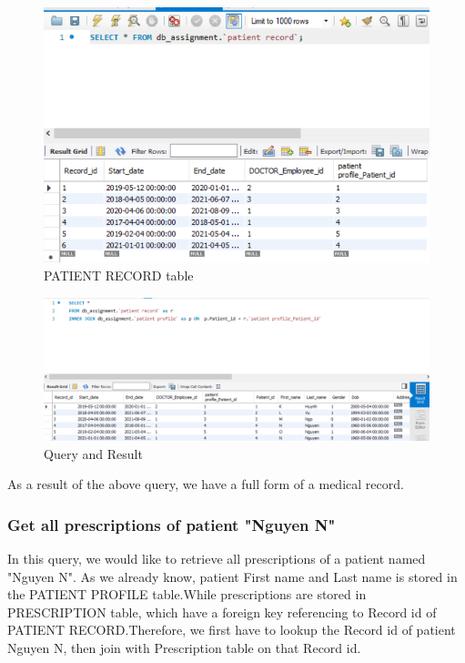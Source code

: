 \begin{figure}[H]
    \centering
    \includegraphics[width = 12cm]{assets/query_1b.png}
    \captionsetup{justification=centering,margin=2cm}
    \caption{PATIENT RECORD table}
\end{figure}

\begin{figure}[H]
    \centering
    \includegraphics[width = 12cm]{assets/query_1a.png}
    \captionsetup{justification=centering,margin=2cm}
    \caption{Query and Result}
\end{figure}

As a result of the above query, we have a full form of a medical record.

\subsubsection{Get all prescriptions of patient "Nguyen N" }
In this query, we would like to retrieve all prescriptions of a patient named "Nguyen N". As we already know, patient First name and Last name is stored in the PATIENT PROFILE table.While prescriptions are stored in PRESCRIPTION table, which have a foreign key referencing to Record id of PATIENT RECORD.Therefore, we first have to lookup the Record id of patient Nguyen N, then join with Prescription table on that Record id.

